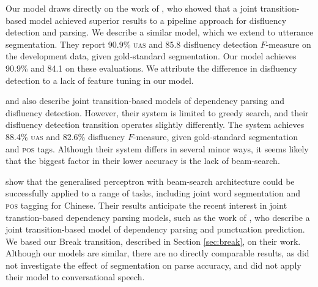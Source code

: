 \documentclass[11pt,letterpaper]{article}
\begin{document}
Our model draws directly on the work of \citet{honnibal:14}, who showed that
a joint transition-based model achieved superior results to a pipeline approach
for disfluency detection and parsing.  We describe a similar model, which we
extend to utterance segmentation.  They report 90.9\% \textsc{uas} and 85.8
disfluency detection $F$-measure on the development data, given gold-standard
segmentation.  Our model achieves 90.9\% and 84.1 on these evaluations.
We attribute the difference in disfluency detection to a lack of feature tuning
in our model.

\citet{rasooli:13} and \citet{rasooli:14} also describe joint transition-based
models of dependency parsing and disfluency detection.  However, their system
is limited to greedy search, and their disfluency detection transition operates
slightly differently.  The \citet{rasooli:14} system achieves 88.4\% \textsc{uas}
and 82.6\% disfluency $F$-measure, given gold-standard segmentation and \textsc{pos}
tags.  Although their system differs in several minor ways, it seems likely that
the biggest factor in their lower accuracy is the lack of beam-search.

\citet{zhang_pos:11} show that the generalised perceptron with beam-search
architecture could be successfully applied to a range of tasks, including
joint word segmentation and \textsc{pos} tagging for Chinese.  Their results
anticipate the recent interest in joint transtion-based dependency parsing
models, such as the work of \citet{dongzhang:13}, who describe a joint
transition-based model of dependency parsing and punctuation prediction.  We
based our Break transition, described in Section \ref{sec:break}, on their
work.  Although our models are similar, there are no directly comparable
results, as \citet{dongzhang:13} did not investigate the effect of segmentation
on parse accuracy, and did not apply their model to conversational speech.

\end{document}
